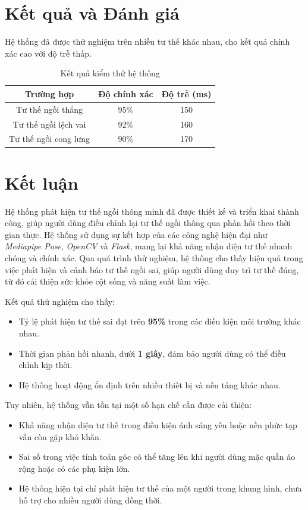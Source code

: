 \documentclass[journal,onecolumn]{IEEEtran}
\begin{document}
\section{\textbf{Kết quả và Đánh giá}}
Hệ thống đã được thử nghiệm trên nhiều tư thế khác nhau, cho kết quả chính xác cao với độ trễ thấp.

\begin{table}[H]
\centering
\caption{Kết quả kiểm thử hệ thống}
\begin{tabular}{@{}ccc@{}}
\toprule
\textbf{Trường hợp} & \textbf{Độ chính xác} & \textbf{Độ trễ (ms)} \\
\midrule
Tư thế ngồi thẳng & 95\% & 150 \\
Tư thế ngồi lệch vai & 92\% & 160 \\
Tư thế ngồi cong lưng & 90\% & 170 \\
\bottomrule
\end{tabular}
\end{table}

\section{\textbf{Kết luận}}
Hệ thống phát hiện tư thế ngồi thông minh đã được thiết kế và triển khai thành công, giúp người dùng điều chỉnh lại tư thế ngồi thông qua phản hồi theo thời gian thực. Hệ thống sử dụng sự kết hợp của các công nghệ hiện đại như \textit{Mediapipe Pose}, \textit{OpenCV} và \textit{Flask}, mang lại khả năng nhận diện tư thế nhanh chóng và chính xác. Qua quá trình thử nghiệm, hệ thống cho thấy hiệu quả trong việc phát hiện và cảnh báo tư thế ngồi sai, giúp người dùng duy trì tư thế đúng, từ đó cải thiện sức khỏe cột sống và năng suất làm việc.  

Kết quả thử nghiệm cho thấy:
\begin{itemize}
    \item Tỷ lệ phát hiện tư thế sai đạt trên \textbf{95\%} trong các điều kiện môi trường khác nhau.
    \item Thời gian phản hồi nhanh, dưới \textbf{1 giây}, đảm bảo người dùng có thể điều chỉnh kịp thời.
    \item Hệ thống hoạt động ổn định trên nhiều thiết bị và nền tảng khác nhau.
\end{itemize}

Tuy nhiên, hệ thống vẫn tồn tại một số hạn chế cần được cải thiện:
\begin{itemize}
    \item Khả năng nhận diện tư thế trong điều kiện ánh sáng yếu hoặc nền phức tạp vẫn còn gặp khó khăn.
    \item Sai số trong việc tính toán góc có thể tăng lên khi người dùng mặc quần áo rộng hoặc có các phụ kiện lớn.
    \item Hệ thống hiện tại chỉ phát hiện tư thế của một người trong khung hình, chưa hỗ trợ cho nhiều người dùng đồng thời.
\end{itemize}
\end{document}

